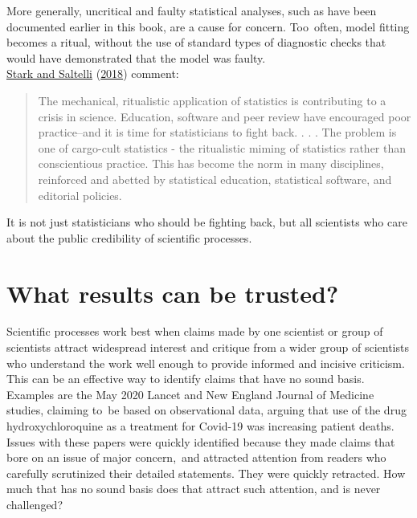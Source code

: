 \documentclass[
  10pt,
  b5paper]{book}
\begin{document}
More generally, uncritical and faulty statistical analyses,
such as have been documented earlier in this book, are a
cause for concern. Too~often, model fitting becomes a ritual,
without the use of standard types of diagnostic checks that
would have demonstrated that the model was faulty.\\
\protect\hyperlink{ref-stark2018cargo}{Stark and Saltelli} (\protect\hyperlink{ref-stark2018cargo}{2018}) comment:

\begin{quote}
The mechanical, ritualistic application of statistics is contributing to a crisis in science. Education, software and peer review have encouraged poor practice--and it is time for statisticians to fight back.
. . .
The problem is one of cargo-cult statistics - the ritualistic miming of
statistics rather than conscientious practice. This has become the norm
in many disciplines, reinforced and abetted by statistical education,
statistical software, and editorial policies.
\end{quote}

It is not just statisticians who should be fighting back, but all
scientists who care about the public credibility of scientific processes.

\hypertarget{what-results-can-be-trusted}{%
\section{What results can be trusted?}\label{what-results-can-be-trusted}}

Scientific processes work best when claims made by one scientist
or group of scientists attract widespread interest and critique
from a wider group of scientists who understand the work well
enough to provide informed and incisive criticism. This can be
an effective way to identify claims that have no sound basis.
Examples are the May 2020 Lancet and New England Journal of
Medicine studies, claiming to~be based on observational data,
arguing that use of the drug hydroxychloroquine as a treatment
for Covid-19 was increasing patient deaths.\\
Issues with these papers were quickly identified because they
made claims that bore on an issue of major concern,~and attracted
attention from readers who carefully scrutinized their detailed
statements. They were quickly retracted. How much that has no
sound basis does that attract such attention, and is never
challenged?
\end{document}
